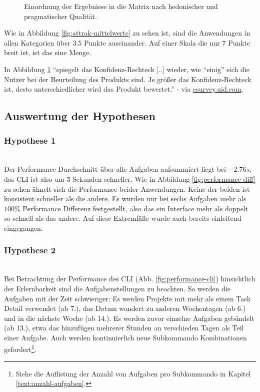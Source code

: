 \documentclass[oneside,bibliography=totocnumbered,BCOR=5mm]{scrbook}
\begin{document}
\begin{figure}[H]
\begin{minipage}[b]{0.4\textwidth}
    \caption{Einordnung der Ergebnisse in die Matrix nach hedonischer und pragmatischer Qualität.}
    \label{fig:attrak-portfolio}
  \end{minipage}
\end{figure}

Wie in Abbildung \ref{fig:attrak-mittelwerte} zu sehen ist, sind die Anwendungen
in allen Kategorien über $3.5$ Punkte auseinander. Auf einer Skala die nur $7$
Punkte breit ist, ist das eine Menge.

In Abbildung \ref{fig:attrak-portfolio} ``spiegelt das Konfidenz-Rechteck
[..] wieder, wie ``einig'' sich die Nutzer bei der Beurteilung
des Produkts sind. Je größer das Konfidenz-Rechteck ist, desto
unterschiedlicher wird das Produkt bewertet.'' - \textcite{attrakdiff} via
\href{https://esurvey.uid.com/}{esurvey.uid.com}.

\subsection{Auswertung der Hypothesen}

\subsubsection{Hypothese 1}
\\
Der Performance Durchschnitt über alle Aufgaben aufsummiert liegt bei
$-2.76 s$, das CLI ist also um \~3 Sekunden schneller. Wie in Abbildung
\ref{fig:performance-diff} zu sehen ähnelt sich die Performance beider
Anwendungen. Keine der beiden ist konsistent schneller als die andere. Es wurden
nur bei sechs Aufgaben mehr als $100\%$ Performance Differenz festgestellt,
also das ein Interface mehr als doppelt so schnell als das andere. Auf diese
Extremfälle wurde auch bereits einleitend eingegangen.

\subsubsection{Hypothese 2}
\\
Bei Betrachtung der Performance des CLI (Abb. \ref{fig:performance-cli})
hinsichtlich der Erlernbarkeit sind die Aufgabenstellungen zu beachten. So
werden die Aufgaben mit der Zeit schwieriger: Es werden Projekte mit mehr als
einem Task Detail verwendet (ab 7.), das Datum wandert zu anderen Wochentagen
(ab 6.) und in die nächste Woche (ab 14.). Es werden zuvor einzelne Aufgaben
gebündelt (ab 13.), etwa das hinzufügen mehrerer Stunden an verschieden
Tagen als Teil einer Aufgabe. Auch werden kontinuierlich neue Subkommando
Kombinationen gefordert\footnote{Siehe die Auflistung der Anzahl von Aufgaben
pro Subkommando in Kapitel \ref{text:anzahl-aufgaben}.}.
\end{document}
